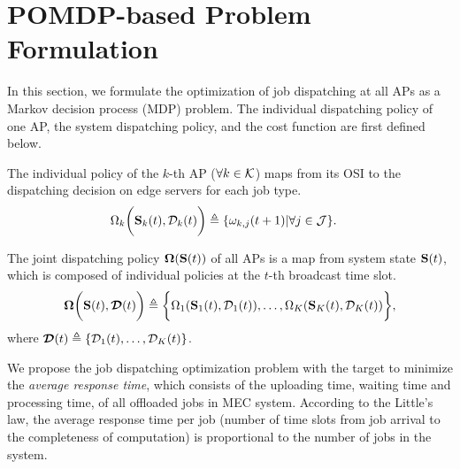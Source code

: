 \section{POMDP-based Problem Formulation}
\label{sec:formulation}
In this section, we formulate the optimization of job dispatching at all APs as a Markov decision process (MDP) problem.
The individual dispatching policy of one AP, the system dispatching policy, and the cost function are first defined below.

\begin{definition}
    The individual policy of the $k$-th AP ($\forall k \in\mathcal{K}$) maps from its OSI to the dispatching decision on edge servers for each job type.
    \begin{align}
        &\Omega_{k} \bigg( \mathbf{S}_{k}(t), \mathcal{D}_{k}(t) \bigg)
        \triangleq \{\omega_{k,j}(t+1)|\forall j\in\mathcal{J}\}.
        \label{def:action}
    \end{align}
\end{definition}

\begin{definition}
    The joint dispatching policy $\boldsymbol{\Omega}(\mathbf{S}(t))$ of all APs is a map from system state $\mathbf{S}(t)$, which is composed of individual policies at the $t$-th broadcast time slot.
    \begin{align}
        \boldsymbol{\Omega}\bigg( \mathbf{S}(t), \boldsymbol{\mathcal{D}}(t) \bigg) \triangleq \bigg\{
            \Omega_{1}(\mathbf{S}_{1}(t), \mathcal{D}_{1}(t)), \dots, \Omega_{K}(\mathbf{S}_{K}(t),\mathcal{D}_{K}(t))
        \bigg\},
    \end{align}
    where $\boldsymbol{\mathcal{D}}(t) \triangleq \{ \mathcal{D}_{1}(t), \dots, \mathcal{D}_{K}(t) \}$.
\end{definition}

We propose the job dispatching optimization problem with the target to minimize the \emph{average response time}, which consists of the uploading time, waiting time and processing time, of all offloaded jobs in MEC system.
According to the Little's law, the average response time per job (number of time slots from job arrival to the completeness of computation) is proportional to the number of jobs in the system.

